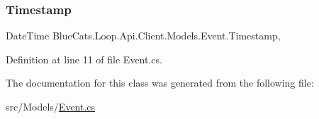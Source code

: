 \subsubsection{\texorpdfstring{Timestamp}{Timestamp}}
{\footnotesize\ttfamily Date\+Time Blue\+Cats.\+Loop.\+Api.\+Client.\+Models.\+Event.\+Timestamp\hspace{0.3cm}{\ttfamily [get]}, {\ttfamily [set]}}



Definition at line 11 of file Event.\+cs.



The documentation for this class was generated from the following file\+:\begin{DoxyCompactItemize}
\item 
src/\+Models/\mbox{\hyperlink{_event_8cs}{Event.\+cs}}\end{DoxyCompactItemize}
